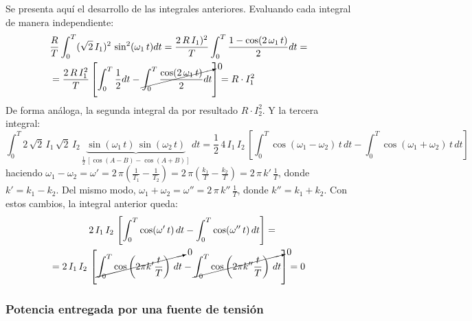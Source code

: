 \begin{remark}
    Se presenta aquí el desarrollo de las integrales anteriores. Evaluando cada integral de manera independiente:
\begin{align*}
    &\dfrac{R}{T} \int_0^T (\sqrt{2}\,I_{1})^2\,\sin^2(\omega_1\,t)dt=\dfrac{2\,R\,I_{1})^2}{T}\int_0^T\dfrac{1-\cos(2\,\omega_1\,t)}{2}dt=\\
    &=\dfrac{2\,R\,I_{1}^2}{T}\left[\int_0^T\dfrac{1}{2}dt-\cancelto{0}{\int_0^T \dfrac{\cos(2\,\omega_1\,t)}{2}dt}\right]=R\cdot I_1^2
\end{align*}
De forma análoga, la segunda integral da por resultado $R\cdot I_2^2$. Y la tercera integral:
\begin{equation*}
    \int_0^T 2\,\sqrt{2}\,I_{1}\, \sqrt{2}\,I_{2}\,\underbrace{\sin(\omega_1\,t)\,\sin(\omega_2\,t)}_{\frac{1}{2}\,\left[\cos(A-B)-\cos(A+B)\right]}\,dt=\dfrac{1}{2}\,4\,I_1\,I_2\,\left[\int_0^T\cos(\omega_1-\omega_2)\,t\,dt-\int_0^T\cos(\omega_1+\omega_2)\,t\,dt\right]
\end{equation*}
haciendo $\omega_1-\omega_2=\omega'=2\,\pi\left(\frac{1}{T_1}-\frac{1}{T_2} \right)=2\,\pi\left(\frac{k_1}{T}-\frac{k_2}{T}\right)=2\,\pi\,k'\,\frac{1}{T}$, donde $k'=k_1-k_2$. Del mismo modo, $\omega_1+\omega_2=\omega''=2\,\pi\,k''\,\frac{1}{T}$, donde $k''=k_1+k_2$. Con estos cambios, la integral anterior queda:
\begin{align*}
    &2\,I_1\,I_2\,\left[\int_0^T\cos(\omega'\,t)\,dt-\int_0^T\cos(\omega''\,t)\,dt\right]=\\
    =2\,I_1\,I_2\,&\left[\cancelto{0}{\int_0^T \cos\left(2\pi k'\dfrac{t}{T}\right)\,dt}-\cancelto{0}{\int_0^T\cos\left(2\pi k''\dfrac{t}{T}\right)\,dt}\right]=0
\end{align*}
\end{remark}


    \subsubsection{Potencia entregada por una fuente de tensión}
    
